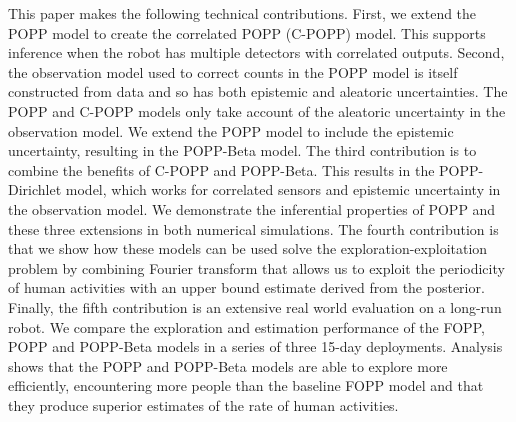 This paper makes the following technical contributions. First, we extend the POPP model to create the correlated POPP (C-POPP) model. This supports inference when the robot has multiple detectors with correlated outputs. Second, the observation model used to correct counts in the POPP model is itself constructed from data and so has both epistemic and aleatoric uncertainties. The POPP and C-POPP models only take account of the aleatoric uncertainty in the observation model. We extend the POPP model to include the epistemic uncertainty, resulting in the POPP-Beta model. The third contribution is to combine the benefits of C-POPP and POPP-Beta. This results in the POPP-Dirichlet model, which works for correlated sensors and epistemic uncertainty in the observation model. We demonstrate the inferential properties of POPP and these three extensions in both numerical simulations. The fourth contribution is that we show how these models can be used solve the exploration-exploitation problem by combining Fourier transform that allows us to exploit the periodicity of human activities with an upper bound estimate derived from the posterior. %
Finally, the fifth contribution is an extensive real world evaluation on a long-run robot. We compare the exploration and estimation performance of the FOPP, POPP and POPP-Beta models in a series of three 15-day deployments. Analysis shows that the POPP and POPP-Beta models are able to explore more efficiently, encountering more people than the baseline FOPP model and that they produce superior estimates of the rate of human activities.

% 

